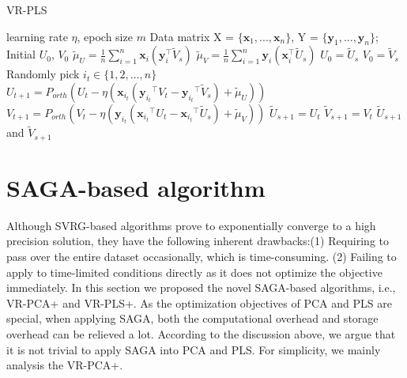 \documentclass[conference]{IEEEtran}
\begin{document}
  \begin{algorithm}[t]
 	\caption{\textsc{VR-PLS}}
	\label{VR-PLS}
	\begin{algorithmic}[1]
	\Require learning rate $\eta$, epoch size $m$
	\Input Data matrix X = $\{\mathbf{x}_1, ... , \mathbf{x}_n\}$, Y = $\{\mathbf{y}_1, ... , \mathbf{y}_n\}$; Initial $U_0$, $V_0$ 
		\State $\tilde{\mu}_U = \frac{1}{n}\sum\limits_{i=1}^{n}\mathbf{x}_{i}(\mathbf{y}_{i}^{\top}\tilde{V}_{s})$
		\State $\tilde{\mu}_V = \frac{1}{n}\sum\limits_{i=1}^{n}\mathbf{y}_{i}(\mathbf{x}_{i}^{\top}\tilde{U}_{s})$	
		\State $U_0 = \tilde{U}_s$
		\State $V_0 = \tilde{V}_s$
			\State Randomly pick $i_t\in\{1, 2, ..., n\}$
			\State $U_{t+1} = P_{orth}(U_{t} - \eta(\mathbf{x}_{i_t} ({\mathbf{y}_{i_t}}^{\top}V_t - {\mathbf{y}_{i_t}}^{\top}\tilde{V}_s) + \tilde{\mu}_U))$
			\State $V_{t+1} = P_{orth}(V_{t} - \eta(\mathbf{y}_{i_t} ({\mathbf{x}_{i_t}}^{\top}U_t - {\mathbf{x}_{i_t}}^{\top}\tilde{U}_s) + \tilde{\mu}_V))$
		\EndFor
		\State $\tilde{U}_{s+1} = U_{t}$
		\State $\tilde{V}_{s+1} = V_{t}$
	\EndFor
	\State \Return $\tilde{U}_{s+1}$ and $\tilde{V}_{s+1}$
	\end{algorithmic}
\end{algorithm}
 
 

 
 
 \section{SAGA-based algorithm}
 \label{SAGA-based}
 Although SVRG-based algorithms prove to exponentially converge to a high precision solution, they have the following inherent drawbacks:(1) Requiring to pass over the entire dataset occasionally, which is time-consuming. (2)  Failing to apply to time-limited conditions directly as it does not optimize the objective immediately.
 In this section we proposed the novel SAGA-based algorithms, i.e., VR-PCA+ and VR-PLS+.
 As the optimization objectives  of PCA and PLS are special, when applying SAGA, both the computational overhead and storage overhead can be relieved a lot. 
 According to the discussion above, we argue that it is not trivial to apply SAGA into PCA and PLS. For simplicity, we mainly analysis the VR-PCA+.
 
\end{document}
